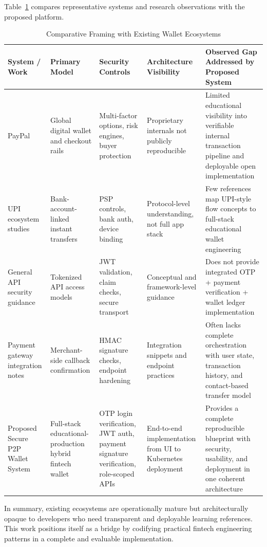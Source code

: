 \documentclass[conference]{IEEEtran}
\begin{document}
Table~\ref{tab:literature_comparison} compares representative systems and research observations with the proposed platform.

\begin{table}[t]
\caption{Comparative Framing with Existing Wallet Ecosystems}
\label{tab:literature_comparison}
\centering
\small
\begin{tabular}{p{2.1cm}p{2.5cm}p{2.2cm}p{2.5cm}p{5.5cm}}
\toprule
\textbf{System / Work} & \textbf{Primary Model} & \textbf{Security Controls} & \textbf{Architecture Visibility} & \textbf{Observed Gap Addressed by Proposed System} \\
\midrule
PayPal \cite{paypal} & Global digital wallet and checkout rails & Multi-factor options, risk engines, buyer protection & Proprietary internals not publicly reproducible & Limited educational visibility into verifiable internal transaction pipeline and deployable open implementation \\
\addlinespace
UPI ecosystem studies \cite{upi,upi_scale,npci} & Bank-account-linked instant transfers & PSP controls, bank auth, device binding & Protocol-level understanding, not full app stack & Few references map UPI-style flow concepts to full-stack educational wallet engineering \\
\addlinespace
General API security guidance \cite{owasp_api,jwt_rfc} & Tokenized API access models & JWT validation, claim checks, secure transport & Conceptual and framework-level guidance & Does not provide integrated OTP + payment verification + wallet ledger implementation \\
\addlinespace
Payment gateway integration notes \cite{razorpay_docs,webhook_security} & Merchant-side callback confirmation & HMAC signature checks, endpoint hardening & Integration snippets and endpoint practices & Often lacks complete orchestration with user state, transaction history, and contact-based transfer model \\
\addlinespace
Proposed Secure P2P Wallet System & Full-stack educational-production hybrid fintech wallet & OTP login verification, JWT auth, payment signature verification, role-scoped APIs & End-to-end implementation from UI to Kubernetes deployment & Provides a complete reproducible blueprint with security, usability, and deployment in one coherent architecture \\
\bottomrule
\end{tabular}
\end{table}

In summary, existing ecosystems are operationally mature but architecturally opaque to developers who need transparent and deployable learning references. This work positions itself as a bridge by codifying practical fintech engineering patterns in a complete and evaluable implementation.
\end{document}
